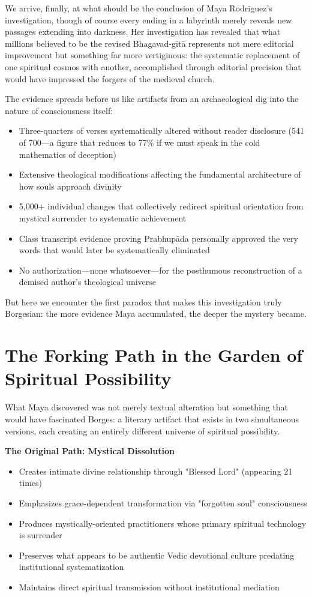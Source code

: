 \documentclass[11pt,twoside]{book}
\begin{document}
We arrive, finally, at what should be the conclusion of Maya Rodriguez's investigation, though of course every ending in a labyrinth merely reveals new passages extending into darkness. Her investigation has revealed that what millions believed to be the revised Bhagavad-gītā represents not mere editorial improvement but something far more vertiginous: the systematic replacement of one spiritual cosmos with another, accomplished through editorial precision that would have impressed the forgers of the medieval church.

The evidence spreads before us like artifacts from an archaeological dig into the nature of consciousness itself:

\begin{itemize}
\item Three-quarters of verses systematically altered without reader disclosure (541 of 700—a figure that reduces to 77\% if we must speak in the cold mathematics of deception)
\item Extensive theological modifications affecting the fundamental architecture of how souls approach divinity
\item 5,000+ individual changes that collectively redirect spiritual orientation from mystical surrender to systematic achievement
\item Class transcript evidence proving Prabhupāda personally approved the very words that would later be systematically eliminated
\item No authorization—none whatsoever—for the posthumous reconstruction of a demised author's theological universe
\end{itemize}

But here we encounter the first paradox that makes this investigation truly Borgesian: the more evidence Maya accumulated, the deeper the mystery became.
\section*{The Forking Path in the Garden of Spiritual Possibility}
\label{sec:org8908e5d}

What Maya discovered was not merely textual alteration but something that would have fascinated Borges: a literary artifact that exists in two simultaneous versions, each creating an entirely different universe of spiritual possibility.

\textbf{\textbf{The Original Path: Mystical Dissolution}}
\begin{itemize}
\item Creates intimate divine relationship through "Blessed Lord" (appearing 21 times)
\item Emphasizes grace-dependent transformation via "forgotten soul" consciousness
\item Produces mystically-oriented practitioners whose primary spiritual technology is surrender
\item Preserves what appears to be authentic Vedic devotional culture predating institutional systematization
\item Maintains direct spiritual transmission without institutional mediation
\end{itemize}
\end{document}
